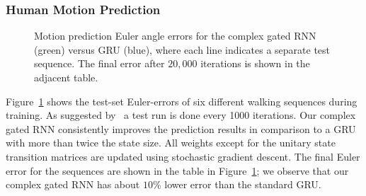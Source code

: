 \documentclass{article}
\begin{document}
\subsubsection{Human Motion Prediction}
\begin{figure}[b]
    \centering
    \caption{\small Motion prediction Euler angle errors for the complex gated RNN (green) versus GRU (blue), where each line indicates a separate test sequence.  The final error after $20,000$ iterations is shown in the adjacent table.}
    \label{fig:euler}
\end{figure}

Figure~\ref{fig:euler} shows the test-set Euler-errors of six different walking sequences during training. As suggested by~\cite{martinez2017human} a test run is done every 1000 iterations. Our complex gated RNN consistently improves the prediction results in comparison to a GRU with more than twice the state size. All weights except for the unitary state transition matrices are updated using stochastic gradient descent.  The final Euler error for the sequences are shown in the table in Figure~\ref{fig:euler}; we observe that our complex gated RNN has about $10\%$ lower error than the standard GRU.  
\end{document}
